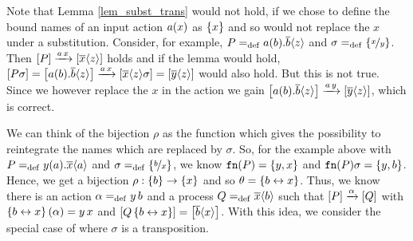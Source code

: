 \begin{old}
Note that Lemma \ref{lem_subst_trans} would not hold, if we chose to define the bound names of an input action $a(x)$ as $\set{x}$ and so would not replace the $x$ under a substitution. Consider, for example, $P=_{\mathrm{def}}a(b).\overline{b}\langle z\rangle$ and $\sigma=_{\mathrm{def}}\left\{\nicefrac{x}{y}\right\}$. Then $\left[P\right]\xrightarrow{a\,x}\left[\overline{x}\langle z\rangle\right]$ holds and if the lemma would hold, $\left[P\sigma\right]=\left[a(b).\overline{b}\langle z\rangle\right]\xrightarrow{a\,x}\left[\overline{x}\langle z\rangle\sigma\right]=\left[\overline{y}\langle z\rangle\right]$ would also hold. But this is not true. Since we however replace the $x$ in the action we gain $\left[a(b).\overline{b}\langle z\rangle\right]\xrightarrow{a\,y}\left[\overline{y}\langle z\rangle\right]$, which is correct.
\end{old}

We can think of the bijection $\rho$ as the function which gives the possibility to reintegrate the names which are replaced by $\sigma$. So, for the example above with $P=_{\mathrm{def}}y(a).\overline{x}\langle a\rangle$ and $\sigma=_{\mathrm{def}}\left\{\nicefrac{b}{x}\right\}$, we know $\fn{P}=\set{y,x}$ and $\fn{P}\sigma=\set{y,b}$. Hence, we get a bijection $\rho:\set{b}\rightarrow\set{x}$ and so $\theta=\left\{b\leftrightarrow{}x\right\}$. Thus, we know there is an action $\alpha=_{\mathrm{def}}{}y\,b$ and a process $Q=_{\mathrm{def}}{\overline{x}\langle b\rangle}$ such that $\left[P\right]\xrightarrow{\alpha}\left[Q\right]$ with $\left\{b\leftrightarrow{}x\right\}(\alpha)=y\,x$ and $\left[Q\left\{b\leftrightarrow{}x\right\}\right]=\left[\overline{b}\langle x\rangle\right]$. With this idea, we consider the special case of  where $\sigma$ is a transposition.

